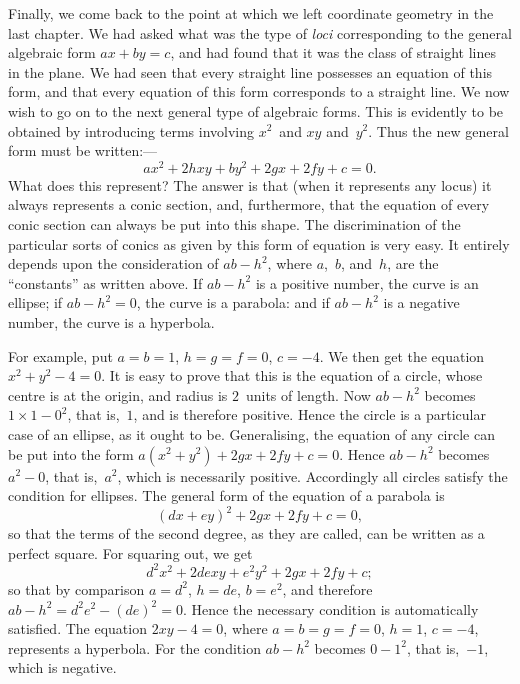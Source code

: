 \documentclass[12pt,leqno]{book}[2005/09/16]
\newcommand{\Chg}[2]{#2}
\newcommand{\Add}[1]{\Chg{}{#1}}
\newcommand{\PageSep}[1]{\ignorespaces}
\begin{document}
Finally, we come back to the point at
%
which we left coordinate geometry in the last
chapter. We had asked what was the type
of \emph{loci} corresponding to the general algebraic
form $ax + by = c$, and had found that it was
the class of straight lines in the plane. We
had seen that every straight line possesses an
equation of this form, and that every equation
of this form corresponds to a straight line.
We now wish to go on to the next general
type of algebraic forms. This is evidently
to be obtained by introducing terms involving
$x^{2}$~and $xy$ and~$y^{2}$. Thus the new general
form must be written\Add{:}---
\[
ax^{2} + 2hxy + by^{2} + 2gx + 2fy + c = 0\Add{.}
\]
What does this represent? The answer is
\PageSep{142}
that (when it represents any locus) it always represents
a conic section, and, furthermore,
that the equation of every conic section can
always be put into this shape. The discrimination
of the particular sorts of conics as given
by this form of equation is very easy. It entirely
depends upon the consideration of $ab - h^{2}$,
where $a$,~$b$, and~$h$, are the ``constants'' as
written above. If $ab - h^{2}$ is a positive number,
the curve is an ellipse; if $ab - h^{2} = 0$, the curve
is a parabola: and if $ab - h^{2}$ is a negative
number, the curve is a hyperbola.

For example, put $a = b = 1$, $h = g = f = 0$,
$c = -4$. We then get the equation $x^{2} + y^{2} - 4 = 0$.
It is easy to prove that this is the equation
of a circle, whose centre is at the origin,
and radius is $2$~units of length. Now $ab - h^{2}$
becomes $1 × 1 - 0^{2}$, that is,~$1$, and is therefore
positive. Hence the circle is a particular
case of an ellipse, as it ought to be. Generalising,
the equation of any circle can be
put into the form $a(x^{2} + y^{2}) + 2gx + 2fy + c = 0$.
Hence $ab - h^{2}$ becomes $a^{2} - 0$, that is,~$a^{2}$,
which is necessarily positive. Accordingly
all circles satisfy the condition for ellipses.
The general form of the equation of a parabola
is
\[
(dx + ey)^{2} + 2gx + 2fy + c = 0,
\]
so that the terms of the second degree, as
\PageSep{143}
they are called, can be written as a perfect
square. For squaring out, we get
\[
d^{2} x^{2} + 2dexy + e^{2} y^{2} + 2gx + 2fy + c;
\]
so that by comparison $a = d^{2}$, $h = de$, $b = e^{2}$,
and therefore $ab - h^{2} = d^{2} e^{2} - (de)^{2} = 0$. Hence
the necessary condition is automatically satisfied.
The equation $2xy - 4 = 0$, where $a = b = g = f = 0$,
$h = 1$, $c = -4$, represents a hyperbola.
For the condition $ab - h^{2}$ becomes
$0 - 1^{2}$, that is,~$-1$, which is negative.
\end{document}
